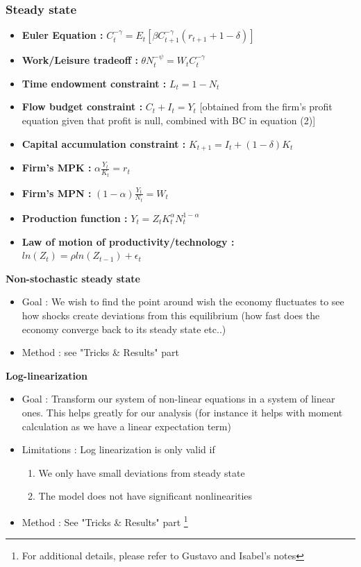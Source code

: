 \documentclass{article}
\begin{document}
\subsubsection{Steady state}
\begin{systembox}
    \begin{itemize}
        \item \textbf{Euler Equation :} $C_t^{-\gamma} = E_t[\beta C_{t+1}^{-\gamma}(r_{t+1}+1-\delta)]$
        \item \textbf{Work/Leisure tradeoff :} $\theta N_t^{-\psi} = W_tC_t^{-\gamma}$
        \item \textbf{Time endowment constraint :} $L_t = 1-N_t$
        \item \textbf{Flow budget constraint :} $C_t+I_t = Y_t$ [obtained from the firm's profit equation given that profit is null, combined with BC in equation (2)]
        \item \textbf{Capital accumulation constraint :} $K_{t+1} = I_t + (1-\delta)K_t$
        \item \textbf{Firm's MPK :} $\alpha\frac{Y_t}{K_t} = r_t$
        \item \textbf{Firm's MPN :} $(1-\alpha)\frac{Y_t}{N_t} = W_t$ 
        \item \textbf{Production function :} $Y_t = Z_tK_t^{\alpha}N_t^{1-\alpha}$
        \item \textbf{Law of motion of productivity/technology :} $ln(Z_t) = \rho ln(Z_{t-1})+\epsilon_t$
    \end{itemize}
\end{systembox}
\textbf{Non-stochastic steady state}
\begin{itemize}
    \item Goal : We wish to find the point around wish the economy fluctuates to see how shocks create deviations from this equilibrium (how fast does the economy converge back to its steady state etc..)
    \item Method : see "Tricks \& Results" part
\end{itemize}

\textbf{Log-linearization}
\begin{itemize}
    \item Goal : Transform our system of non-linear equations in a system of linear ones. This helps greatly for our analysis (for instance it helps with moment calculation as we have a linear expectation term)
    \item Limitations : Log linearization is only valid if 
    \begin{enumerate}
        \item We only have small deviations from steady state
        \item The model does not have significant nonlinearities
    \end{enumerate}
    \item Method : See "Tricks \& Results" part \footnote{For additional details, please refer to Gustavo and Isabel's notes}
\end{itemize}
\end{document}
